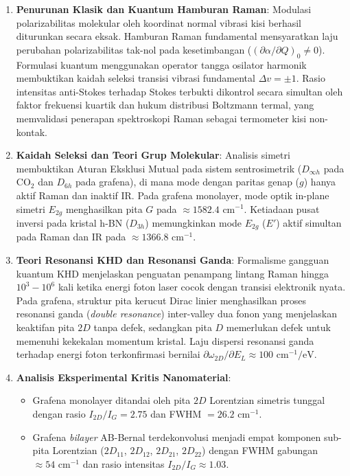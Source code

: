 \begin{enumerate}
    \item \textbf{Penurunan Klasik dan Kuantum Hamburan Raman}: Modulasi polarizabilitas molekular oleh koordinat normal vibrasi kisi berhasil diturunkan secara eksak. Hamburan Raman fundamental mensyaratkan laju perubahan polarizabilitas tak-nol pada kesetimbangan ($(\partial\alpha/\partial Q)_0 \neq 0$). Formulasi kuantum menggunakan operator tangga osilator harmonik membuktikan kaidah seleksi transisi vibrasi fundamental $\Delta v = \pm 1$. Rasio intensitas anti-Stokes terhadap Stokes terbukti dikontrol secara simultan oleh faktor frekuensi kuartik dan hukum distribusi Boltzmann termal, yang memvalidasi penerapan spektroskopi Raman sebagai termometer kisi non-kontak.
    \item \textbf{Kaidah Seleksi dan Teori Grup Molekular}: Analisis simetri membuktikan Aturan Eksklusi Mutual pada sistem sentrosimetrik ($D_{\infty h}$ pada $\text{CO}_2$ dan $D_{6h}$ pada grafena), di mana mode dengan paritas genap ($g$) hanya aktif Raman dan inaktif IR. Pada grafena monolayer, mode optik in-plane simetri $E_{2g}$ menghasilkan pita $G$ pada $\approx 1582.4\text{ cm}^{-1}$. Ketiadaan pusat inversi pada kristal h-BN ($D_{3h}$) memungkinkan mode $E_{2g}$ ($E'$) aktif simultan pada Raman dan IR pada $\approx 1366.8\text{ cm}^{-1}$.
    \item \textbf{Teori Resonansi KHD dan Resonansi Ganda}: Formalisme gangguan kuantum KHD menjelaskan penguatan penampang lintang Raman hingga $10^3 - 10^6$ kali ketika energi foton laser cocok dengan transisi elektronik nyata. Pada grafena, struktur pita kerucut Dirac linier menghasilkan proses resonansi ganda (\textit{double resonance}) inter-valley dua fonon yang menjelaskan keaktifan pita $2D$ tanpa defek, sedangkan pita $D$ memerlukan defek untuk memenuhi kekekalan momentum kristal. Laju dispersi resonansi ganda terhadap energi foton terkonfirmasi bernilai $\partial\omega_{2D}/\partial E_L \approx 100\text{ cm}^{-1}/\text{eV}$.
    \item \textbf{Analisis Eksperimental Kritis Nanomaterial}:
    \begin{itemize}
        \item Grafena monolayer ditandai oleh pita $2D$ Lorentzian simetris tunggal dengan rasio $I_{2D}/I_G = 2.75$ dan FWHM $= 26.2\text{ cm}^{-1}$.
        \item Grafena \textit{bilayer} AB-Bernal terdekonvolusi menjadi empat komponen sub-pita Lorentzian ($2D_{11}$, $2D_{12}$, $2D_{21}$, $2D_{22}$) dengan FWHM gabungan $\approx 54\text{ cm}^{-1}$ dan rasio intensitas $I_{2D}/I_G \approx 1.03$.

\end{itemize}
\end{enumerate}
